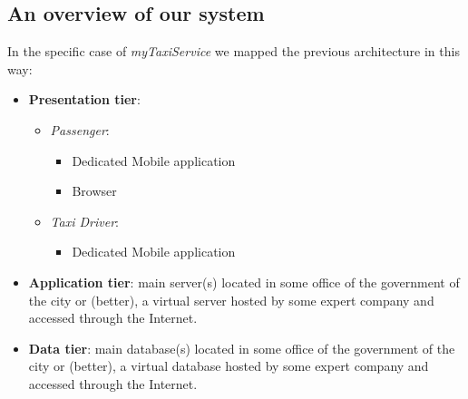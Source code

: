 \subsection{An overview of our system}
In the specific case of \textit{myTaxiService} we mapped the previous architecture in this way:
\begin{itemize}
	\item \textbf{Presentation tier}:
	\begin{itemize}
		\item \textit{Passenger}:
		\begin{itemize}
			\item Dedicated Mobile application
			\item Browser
		\end{itemize}
		\item \textit{Taxi Driver}:
		\begin{itemize}
			\item Dedicated Mobile application
		\end{itemize}
	\end{itemize}
	\item \textbf{Application tier}: main server(s) located in some office of the government of the city or (better), a virtual server hosted by some expert company and accessed through the Internet.
	\item \textbf{Data tier}: main database(s) located in some office of the government of the city or (better), a virtual database hosted by some expert company and accessed through the Internet. 
\end{itemize}
